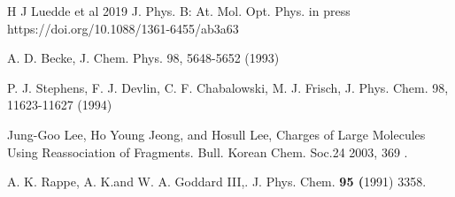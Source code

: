 \documentclass[preprint,showpacs]{revtex4}
\begin{document}
\begin{thebibliography}{99}
H J Luedde et al 2019 
J. Phys. B: At. Mol. Opt. Phys. in press https://doi.org/10.1088/1361-6455/ab3a63

A. D. Becke, 
J. Chem. Phys. 98, 5648-5652 (1993) 

P. J. Stephens, F. J. Devlin, C. F. Chabalowski, M. J. Frisch,
J. Phys. Chem. 98, 11623-11627 (1994) 

Jung-Goo Lee, Ho Young Jeong, and Hosull Lee, Charges of
Large Molecules Using Reassociation of Fragments. 
Bull. Korean Chem. Soc.24 2003, 369 .

A. K. Rappe, A. K.and W. A. Goddard III,. 
J. Phys. Chem. \textbf{95 (}1991) 3358.







\end{thebibliography}
\end{document}
